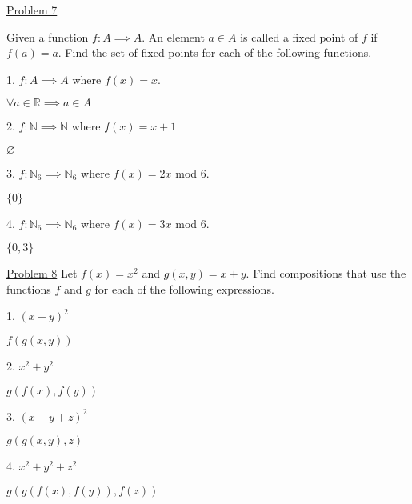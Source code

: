 \documentclass{article}
\begin{document}
\underline{Problem 7}

Given a function $f: A\implies A$. An element $a \in A$ is called a fixed point of $f$ if $f(a)=a$. Find the set of fixed points for each of the following functions.

1. $f: A \implies A$ where $f(x)=x$.

$\forall a \in \mathbb{R} \implies a \in A$\newline

2. $f:\mathbb{N}\implies \mathbb{N}$ where $f(x)=x+1$

$\varnothing$\newline

3. $f:\mathbb{N}_6 \implies \mathbb{N}_6$ where $f(x)=2x$ mod 6.

$\{0\}$\newline

4. $f:\mathbb{N}_6 \implies \mathbb{N}_6$ where $f(x)=3x$ mod 6.

$\{0,3\}$\newline

\underline{Problem 8}
Let $f(x)=x^2$ and $g(x,y)=x+y$. Find compositions that use the functions $f$ and $g$ for each of the following expressions.\newline

1. $(x+y)^2$

$f(g(x,y))$\newline

2. $x^2+y^2$

$g(f(x),f(y))$\newline

3. $(x+y+z)^2$

$g(g(x,y),z)$\newline

4. $x^2 + y^2 + z^2$

$g(g(f(x),f(y)),f(z))$
\end{document}
